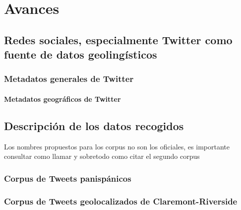\chapter{Avances}

\section{Redes sociales, especialmente Twitter como fuente de datos geolingísticos}
\subsection{Metadatos generales de Twitter}
\subsubsection{Metadatos geográficos de Twitter}

\section{Descripción de los datos recogidos}
{\color{red} Los nombres propuestos para los corpus no son los oficiales,
  es importante consultar como llamar y sobretodo como citar el segundo
corpus}
\subsection{Corpus de Tweets panispánicos}
\subsection{Corpus de Tweets geolocalizados de Claremont-Riverside}

